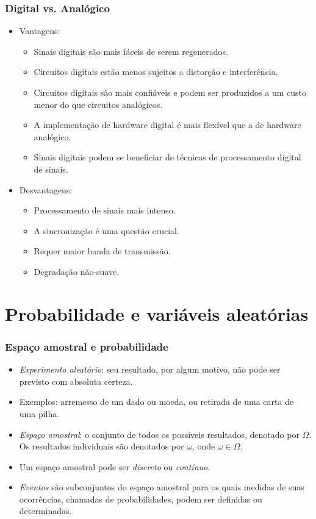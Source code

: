 \begin{frame}
    \frametitle{Digital vs. Analógico}
    
    \begin{itemize}
     \item Vantagens:
	\begin{itemize}
	 \item Sinais digitais são mais fáceis de serem regenerados.
	  \item Circuitos digitais estão menos sujeitos a distorção e interferência.
	  \item Circuitos digitais são mais confiáveis e podem ser produzidos a um custo menor do que circuitos analógicos.
	  \item A implementação de hardware digital é mais flexível que a de hardware analógico.
	  \item Sinais digitais podem se beneficiar de técnicas de processamento digital de sinais.
	\end{itemize}
     \item Desvantagens:
	\begin{itemize}
	 \item Processamento de sinais mais intenso. 
	  \item A sincronização é uma questão crucial.
	  \item Requer maior banda de transmissão.
	  \item Degradação não-suave.
	\end{itemize}
    \end{itemize}
\end{frame}

\section{Probabilidade e variáveis aleatórias}

\begin{frame}
    \frametitle{Espaço amostral e probabilidade}
    
    \begin{itemize}
     \item \textit{Experimento aleatório}: seu resultado, por algum motivo, não pode ser previsto com absoluta certeza.
      \item Exemplos: arremesso de um dado ou moeda, ou retirada de uma carta de uma pilha.
      \item \textit{Espaço amostral}: o conjunto de todos os possíveis resultados, denotado por $\Omega$. Os resultados individuais são denotados por $\omega$, onde $\omega \in \Omega$.
      \item Um espaço amostral pode ser \textit{discreto} ou \textit{contínuo}.
      \item \textit{Eventos} são subconjuntos do espaço amostral para os quais medidas de suas ocorrências, chamadas de probabilidades, podem ser definidas ou determinadas.
    \end{itemize}
\end{frame}

